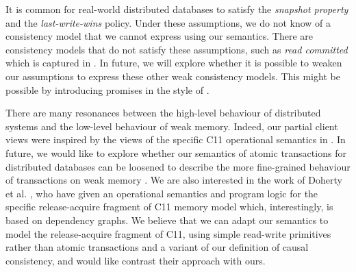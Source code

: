 It is common for real-world distributed databases to satisfy the
\emph{snapshot property} and the \emph{last-write-wins} policy. 
Under these assumptions, we do not know of a consistency
model that we cannot express using our semantics. 
There are consistency models that do not satisfy these assumptions,
such as \emph{read committed} \cite{ramp} which is  captured in \cite{seebelieve}. 
In future, we  will explore whether it is possible to weaken our
assumptions to express these other 
weak consistency models. This might be possible by introducing promises 
in the style of \cite{promises}. 


There are many resonances between the high-level  behaviour
of distributed systems and the low-level behaviour  of weak
memory. Indeed, our partial client views were 
inspired by the views of  the specific C11 operational semantics
in \cite{promises}. In future, we would like to explore whether our semantics 
of atomic transactions for distributed databases can be loosened to
describe the more fine-grained behaviour of transactions on weak
memory \cite{PSI-RA,DBLP:conf/pldi/ChongSW18}. We are also interested in the
work of 
Doherty et al. \citet{op-semantics-c11-rar}, who have given  an
operational semantics and program logic
for the specific release-acquire fragment of C11 memory model which, interestingly, 
is based on dependency graphs. We believe that we can adapt our
semantics to 
model the release-acquire fragment of C11, using simple read-write
primitives rather than atomic transactions and 
 a variant of our definition of causal consistency, and would like 
contrast their approach with ours. 
